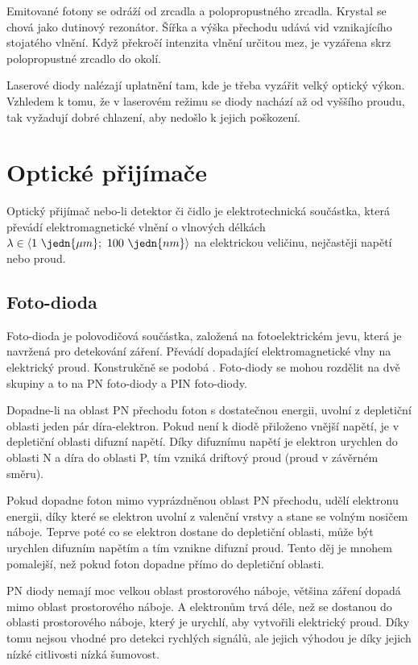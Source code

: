 Emitované fotony se odráží od zrcadla a polopropustného zrcadla.  Krystal se chová jako dutinový rezonátor. Šířka a výška přechodu udává vid vznikajícího stojatého vlnění. Když překročí intenzita vlnění určitou mez, je vyzářena skrz polopropustné zrcadlo do okolí.

Laserové diody nalézají uplatnění tam, kde je třeba vyzářit velký optický výkon. Vzhledem k tomu, že v laserovém režimu se diody nachází až od vyššího proudu, tak vyžadují dobré chlazení, aby nedošlo k jejich poškození.

\section{Optické přijímače}
Optický přijímač nebo-li detektor či čidlo je elektrotechnická součástka, která převádí elektromagnetické vlnění o vlnových délkách $\lambda \in \langle 1~\jedn{\mu m};~100~\jedn{nm} \rangle$ na elektrickou veličinu, nejčastěji napětí nebo proud.

\subsection{Foto-dioda}
Foto-dioda je polovodičová součástka, založená na fotoelektrickém jevu, která je navržená pro detekování záření. Převádí dopadající elektromagnetické vlny na elektrický proud. Konstrukčně se podobá . Foto-diody se
mohou rozdělit na dvě skupiny a to na PN foto-diody a PIN foto-diody.

Dopadne-li na oblast PN přechodu foton s dostatečnou energii, uvolní z depletiční oblasti jeden pár díra-elektron. Pokud není k diodě přiloženo vnější napětí, je v depletiční oblasti difuzní napětí. Díky difuznímu napětí je elektron urychlen do oblasti N a díra do oblasti P, tím vzniká driftový proud (proud v závěrném směru).

Pokud dopadne foton mimo vyprázdněnou oblast PN přechodu, udělí elektronu energii, díky které se elektron uvolní z valenční vrstvy a stane se volným nosičem náboje. Teprve poté co se elektron dostane do depletiční oblasti, může být urychlen difuzním napětím a tím vznikne difuzní proud. Tento děj je mnohem pomalejší, než pokud foton dopadne přímo do depletiční oblasti.

PN diody nemají moc velkou oblast prostorového náboje, většina záření dopadá mimo oblast prostorového náboje. A elektronům trvá déle, než se dostanou do oblasti prostorového náboje, který je urychlí, aby vytvořili elektrický proud. Díky tomu nejsou vhodné pro detekci rychlých signálů, ale jejich výhodou je díky jejich nízké citlivosti nízká šumovost.

